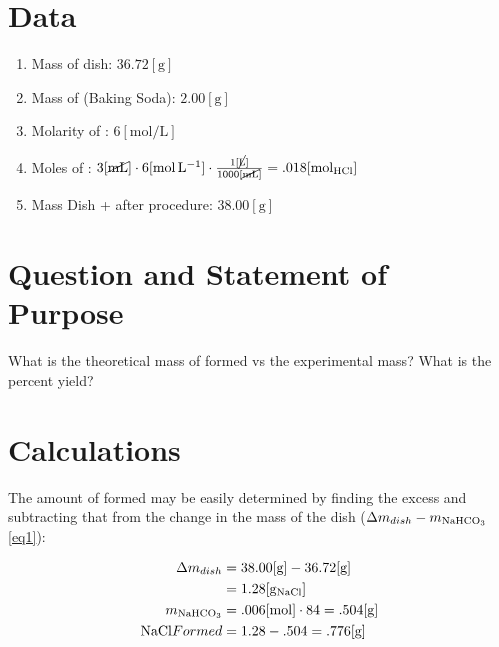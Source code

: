 \documentclass{article}
\begin{document}
\section{Data}

    \begin{enumerate}

      \item Mass of dish: $36.72[\si{\gram}]$

      \item Mass of  (Baking Soda): $2.00[\si{\gram}]$

      \item Molarity of : $6[\si{\mole\per\liter}]$

      \item Moles of : $3[\cancel{\si{\milli\liter}}]\cdot6[\si{\mole\per\liter}]\cdot\frac{1[\cancel{\si{\liter}}]}{1000[\cancel{\si{\milli\liter}}]}=.018[\si{\mole}_{\ce{HCl}}]$

      \item Mass Dish +  after procedure: $38.00[\si{\gram}]$

    \end{enumerate}

\section{Question and Statement of Purpose}

    \begin{justify}

      What is the theoretical mass of  formed vs the experimental mass? What is the percent yield?

    \end{justify}
    
\newpage

\section{Calculations}

    \begin{justify}

      The amount of  formed may be easily determined by finding the excess  and subtracting that from the change in the mass of the dish ($\Delta m_{dish}-m_{\ce{NaHCO3}}$ \eqref{eq1}):
    \end{justify}

\begin{equation} \label{eq1}
\begin{split}
  \Delta m_{dish} & = 38.00[\si{\gram}]-36.72[\si{\gram}] \\
 & =1.28[\si{\gram}_{\ce{NaCl}}]\\
 m_{\ce{NaHCO3}} & = .006[\si{\mole}] \cdot 84= .504 [\si{\gram}]\\
 \ce{NaCl} Formed & = 1.28-.504=.776[\si{\gram}]
\end{split}
\end{equation}
\end{document}

